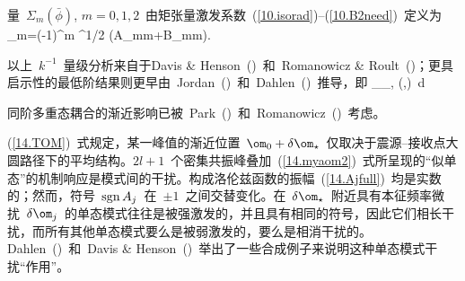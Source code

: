 \en

量~$\Sigma_m(\bar{\phi})$, $m=0,1,2$~由矩张量激发系数~(\ref{10.isorad})--(\ref{10.B2need})~定义为
\eq
\Sigma_m=(-1)^m
^{1/2}
(A_m\cos m\ophi+B_m\sin m\ophi).
\en

以上~$k^{-1}$~量级分析来自于Davis \& Henson~(\citeyear{davis&henson86})~和~Romanowicz \& Roult~(\citeyear{romanowicz&roult86})；更具启示性的最低阶结果则更早由~Jordan~(\citeyear{jordan78})~和~Dahlen~(\citeyear{dahlen79})~推导，即
\eq \label{14.TOM}
\delta\omega_{\star}\approx{}\oint_{\otheta,\ophi}
\delta\omega(\theta,\phi)
\,d\/\Delta
\en

同阶多重态耦合的渐近影响已被~Park~(\citeyear{park87})~和~Romanowicz~(\citeyear{romanowicz87})~考虑。

(\ref{14.TOM})~式规定，某一峰值的渐近位置~$\om_0+\delta\om_{\star}$~仅取决于震源--接收点大圆路径下的平均结构。$2l+1$~个密集共振峰叠加~(\ref{14.myaom2})~式所呈现的“似单态”的机制响应是模式间的干扰。构成洛伦兹函数的振幅~(\ref{14.Ajfull})~均是实数的；然而，符号~${\rm sgn}\,A_j$~在~$\pm 1$~之间交替变化。在~$\delta\om_{\star}$~附近具有本征频率微扰~$\delta\om_j$~的单态模式往往是被强激发的，并且具有相同的符号，因此它们相长干扰，而所有其他单态模式要么是被弱激发的，要么是相消干扰的。Dahlen~(\citeyear{dahlen79b})~和~Davis \& Henson~(\citeyear{davis&henson86})~举出了一些合成例子来说明这种单态模式干扰“作用”。

